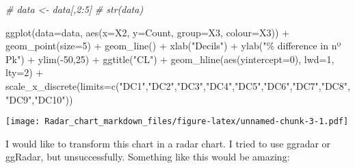 \documentclass[
]{article}
\newenvironment{Shaded}{\begin{snugshade}}{\end{snugshade}}
\newcommand{\AttributeTok}[1]{\textcolor[rgb]{0.77,0.63,0.00}{#1}}
\newcommand{\CommentTok}[1]{\textcolor[rgb]{0.56,0.35,0.01}{\textit{#1}}}
\newcommand{\DecValTok}[1]{\textcolor[rgb]{0.00,0.00,0.81}{#1}}
\newcommand{\FunctionTok}[1]{\textcolor[rgb]{0.00,0.00,0.00}{#1}}
\newcommand{\NormalTok}[1]{#1}
\newcommand{\SpecialCharTok}[1]{\textcolor[rgb]{0.00,0.00,0.00}{#1}}
\newcommand{\StringTok}[1]{\textcolor[rgb]{0.31,0.60,0.02}{#1}}
\begin{document}
\begin{Shaded}
\begin{Highlighting}[]
\CommentTok{\# data \textless{}{-} data[,2:5]}
\CommentTok{\# str(data)}


\FunctionTok{ggplot}\NormalTok{(}\AttributeTok{data=}\NormalTok{data,  }\FunctionTok{aes}\NormalTok{(}\AttributeTok{x=}\NormalTok{X2, }\AttributeTok{y=}\NormalTok{Count, }\AttributeTok{group=}\NormalTok{X3, }\AttributeTok{colour=}\NormalTok{X3)) }\SpecialCharTok{+} 
  \FunctionTok{geom\_point}\NormalTok{(}\AttributeTok{size=}\DecValTok{5}\NormalTok{) }\SpecialCharTok{+} 
  \FunctionTok{geom\_line}\NormalTok{() }\SpecialCharTok{+} 
  \FunctionTok{xlab}\NormalTok{(}\StringTok{"Decils"}\NormalTok{) }\SpecialCharTok{+} 
  \FunctionTok{ylab}\NormalTok{(}\StringTok{"\% difference in nº Pk"}\NormalTok{) }\SpecialCharTok{+} 
  \FunctionTok{ylim}\NormalTok{(}\SpecialCharTok{{-}}\DecValTok{50}\NormalTok{,}\DecValTok{25}\NormalTok{) }\SpecialCharTok{+} \FunctionTok{ggtitle}\NormalTok{(}\StringTok{"CL"}\NormalTok{)  }\SpecialCharTok{+} 
  \FunctionTok{geom\_hline}\NormalTok{(}\FunctionTok{aes}\NormalTok{(}\AttributeTok{yintercept=}\DecValTok{0}\NormalTok{), }\AttributeTok{lwd=}\DecValTok{1}\NormalTok{, }\AttributeTok{lty=}\DecValTok{2}\NormalTok{) }\SpecialCharTok{+} 
  \FunctionTok{scale\_x\_discrete}\NormalTok{(}\AttributeTok{limits=}\FunctionTok{c}\NormalTok{(}\StringTok{"DC1"}\NormalTok{,}\StringTok{"DC2"}\NormalTok{,}\StringTok{"DC3"}\NormalTok{,}\StringTok{"DC4"}\NormalTok{,}\StringTok{"DC5"}\NormalTok{,}\StringTok{"DC6"}\NormalTok{,}\StringTok{"DC7"}\NormalTok{,}\StringTok{"DC8"}\NormalTok{,}\StringTok{"DC9"}\NormalTok{,}\StringTok{"DC10"}\NormalTok{))}
\end{Highlighting}
\end{Shaded}

\texttt{[image: Radar\_chart\_markdown\_files/figure-latex/unnamed-chunk-3-1.pdf]}

I would like to transform this chart in a radar chart. I tried to use
ggradar or ggRadar, but unsuccessfully. Something like this would be
amazing:
\end{document}

